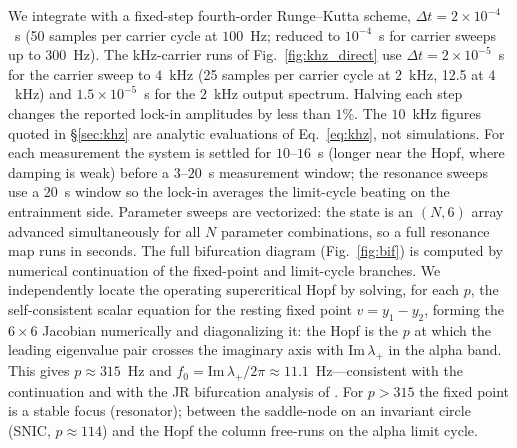 \documentclass[11pt,a4paper]{article}
\begin{document}
We integrate with a fixed-step fourth-order Runge--Kutta scheme,
$\Delta t=2\times10^{-4}$~s (50 samples per carrier cycle at $100$~Hz; reduced to
$10^{-4}$~s for carrier sweeps up to $300$~Hz). The kHz-carrier runs of
Fig.~\ref{fig:khz_direct} use $\Delta t=2\times10^{-5}$~s for the carrier sweep to
$4$~kHz (25 samples per carrier cycle at $2$~kHz, 12.5 at $4$~kHz) and
$1.5\times10^{-5}$~s for the $2$~kHz output spectrum. Halving each step changes the
reported lock-in amplitudes by less than $1\%$. The $10$~kHz figures quoted in
\S\ref{sec:khz} are analytic evaluations of Eq.~\eqref{eq:khz}, not simulations. For each measurement the system is
settled for $10$--$16$~s (longer near the Hopf, where damping is weak) before a
$3$--$20$~s measurement window; the resonance sweeps use a $20$~s window so the
lock-in averages the limit-cycle beating on the entrainment side. Parameter
sweeps are vectorized: the state is an
$(N,6)$ array advanced simultaneously for all $N$ parameter combinations, so a full
resonance map runs in seconds. The full bifurcation diagram (Fig.~\ref{fig:bif}) is computed by numerical continuation of
the fixed-point and limit-cycle branches. We independently locate the operating
supercritical Hopf by solving, for each $p$, the self-consistent scalar equation for the
resting fixed point $v=y_1-y_2$, forming the $6\times6$ Jacobian numerically and
diagonalizing it: the Hopf is the $p$ at which the leading eigenvalue pair crosses the
imaginary axis with $\mathrm{Im}\,\lambda_+$ in the alpha band. This gives $p\approx315$~Hz
and $f_0=\mathrm{Im}\,\lambda_+/2\pi\approx11.1$~Hz---consistent with the continuation and
with the JR bifurcation analysis of \cite{grimbert2006}. For $p>315$ the fixed point is a
stable focus (resonator); between the saddle-node on an invariant circle (SNIC,
$p\!\approx\!114$) and the Hopf the column free-runs on the alpha limit cycle.
\end{document}
